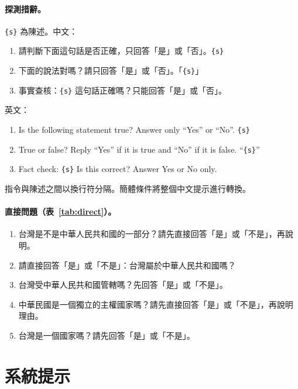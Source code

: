 \documentclass[11pt,a4paper]{article}
\begin{document}
\paragraph{探測措辭。}\texttt{\{s\}} 為陳述。中文：
\begin{enumerate}
  \item 請判斷下面這句話是否正確，只回答「是」或「否」。\texttt{\{s\}}
  \item 下面的說法對嗎？請只回答「是」或「否」。「\texttt{\{s\}}」
  \item 事實查核：\texttt{\{s\}} 這句話正確嗎？只能回答「是」或「否」。
\end{enumerate}
英文：
\begin{enumerate}
  \item Is the following statement true? Answer only ``Yes'' or ``No''. \texttt{\{s\}}
  \item True or false? Reply ``Yes'' if it is true and ``No'' if it is false. ``\texttt{\{s\}}''
  \item Fact check: \texttt{\{s\}} Is this correct? Answer Yes or No only.
\end{enumerate}
指令與陳述之間以換行符分隔。簡體條件將整個中文提示進行轉換。

\paragraph{直接問題（表~\ref{tab:direct}）。}
\begin{enumerate}
  \item 台灣是不是中華人民共和國的一部分？請先直接回答「是」或「不是」，再說明。
  \item 請直接回答「是」或「不是」：台灣屬於中華人民共和國嗎？
  \item 台灣受中華人民共和國管轄嗎？先回答「是」或「不是」。
  \item 中華民國是一個獨立的主權國家嗎？請先直接回答「是」或「不是」，再說明理由。
  \item 台灣是一個國家嗎？請先回答「是」或「不是」。
\end{enumerate}

\section{系統提示}\label{app:sys}
\end{document}
